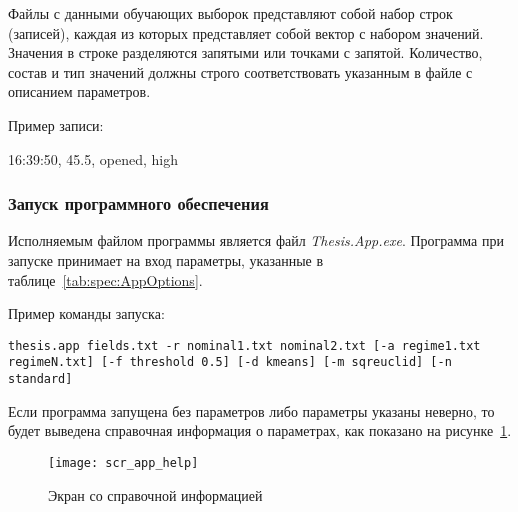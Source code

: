 Файлы с данными обучающих выборок представляют собой набор строк (записей), каждая из которых представляет собой вектор с набором значений. Значения в строке разделяются запятыми или точками с запятой. Количество, состав и тип значений должны строго соответствовать указанным в файле с описанием параметров.

Пример записи:

\textsf{16:39:50, 45.5, opened, high}

\subsubsection{Запуск программного обеспечения}
Исполняемым файлом программы является файл \textit{Thesis.App.exe}. Программа при запуске принимает на вход параметры, указанные в таблице~\ref{tab:spec:AppOptions}.

Пример команды запуска:

\texttt{thesis.app fields.txt -r nominal1.txt nominal2.txt [-a regime1.txt regimeN.txt] [-f threshold 0.5] [-d kmeans] [-m sqreuclid] [-n standard]}

Если программа запущена без параметров либо параметры указаны неверно, то будет выведена справочная информация о параметрах, как показано на рисунке~\ref{fig:spec:scr:AppHelp}.

\begin{figure}[h]
\texttt{[image: scr\_app\_help]}
\caption{Экран со справочной информацией}
\label{fig:spec:scr:AppHelp}
\end{figure}

